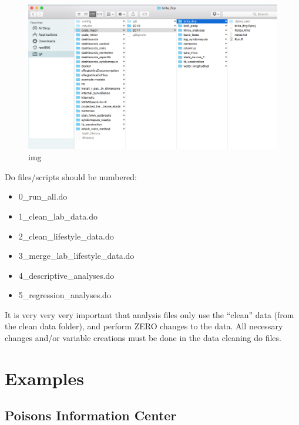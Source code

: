 \documentclass[12pt,]{article}
\providecommand{\tightlist}{%
  \setlength{\itemsep}{0pt}\setlength{\parskip}{0pt}}
\begin{document}
\begin{figure}
\centering
\includegraphics{resources/folder_git.png}
\caption{img}
\end{figure}

Do files/scripts should be numbered:

\begin{itemize}
\tightlist
\item
  0\_run\_all.do
\item
  1\_clean\_lab\_data.do
\item
  2\_clean\_lifestyle\_data.do
\item
  3\_merge\_lab\_lifestyle\_data.do
\item
  4\_descriptive\_analyses.do
\item
  5\_regression\_analyses.do
\end{itemize}

It is very very very important that analysis files only use the
``clean'' data (from the clean data folder), and perform ZERO changes to
the data. All necessary changes and/or variable creations must be done
in the data cleaning do files.

\section{Examples}\label{examples-1}

\subsection{Poisons Information
Center}\label{poisons-information-center}
\end{document}
